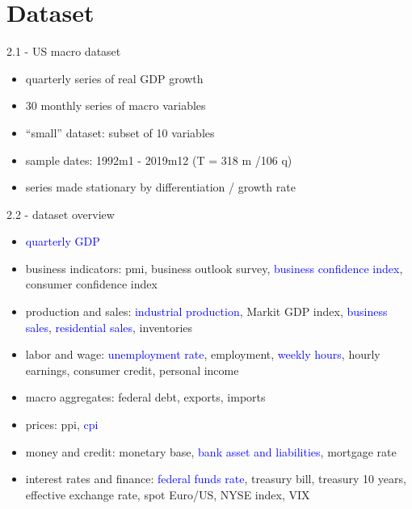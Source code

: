 \section{Dataset}

\begin{frame}{2.1 - US macro dataset}
	\begin{itemize}
	\item quarterly series of real GDP growth
	\item 30 monthly series of macro variables
	\item ``small'' dataset: subset of 10 variables
	\item sample dates: 1992m1 - 2019m12 (T = 318 m /106 q)
	\item series made stationary by differentiation / growth rate
	\end{itemize}
\end{frame}

\begin{frame}{2.2 - dataset overview}
	\begin{itemize}
		\item \textcolor{blue}{quarterly GDP}
		\item business indicators: pmi, business outlook survey, \textcolor{blue}{business confidence index}, consumer confidence index
		\item production and sales: \textcolor{blue}{industrial production}, Markit GDP index, \textcolor{blue}{business sales}, \textcolor{blue}{residential sales}, inventories
		\item labor and wage: \textcolor{blue}{unemployment rate}, employment, \textcolor{blue}{weekly hours}, hourly earnings, consumer credit, personal income
		\item macro aggregates: federal debt, exports, imports
		\item prices: ppi, \textcolor{blue}{cpi}
		\item money and credit: monetary base, \textcolor{blue}{bank asset and liabilities}, mortgage rate
		\item interest rates and finance: \textcolor{blue}{federal funds rate}, treasury bill, treasury 10 years, effective exchange rate, spot Euro/US, NYSE index, VIX
	\end{itemize}
\end{frame}
